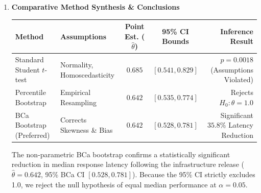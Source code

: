 \documentclass[11pt,a4paper]{scrartcl}
\begin{document}
\begin{enumerate}
\begin{center}
  \end{center}

  \item \textbf{Comparative Method Synthesis \& Conclusions}

  \begin{center}
  \footnotesize
  \begin{tabularx}{\textwidth}{l L c c R}
    \toprule
    \textbf{Method} & \textbf{Assumptions} & \textbf{Point Est. ($\hat{\theta}$)} & \textbf{95\% CI Bounds} & \textbf{Inference Result} \\
    \midrule
    Standard Student $t$-test & Normality, Homoscedasticity & $0.685$ & $[0.541, 0.829]$ & $p = 0.0018$ (Assumptions Violated) \\{}
    Percentile Bootstrap & Empirical Resampling & $0.642$ & $[0.535, 0.774]$ & Rejects $H_0: \theta = 1.0$ \\{}
    BCa Bootstrap (Preferred) & Corrects Skewness \& Bias & $0.642$ & $[0.528, 0.781]$ & Significant $35.8\%$ Latency Reduction \\
    \bottomrule
  \end{tabularx}
  \end{center}

  \begin{statbox}
    The non-parametric BCa bootstrap confirms a statistically significant reduction in median response latency following the infrastructure release ($\hat{\theta} = 0.642$, 95\% BCa CI $[0.528, 0.781]$). Because the 95\% CI strictly excludes 1.0, we reject the null hypothesis of equal median performance at $\alpha = 0.05$.
  \end{statbox}
\end{enumerate}
\end{document}
